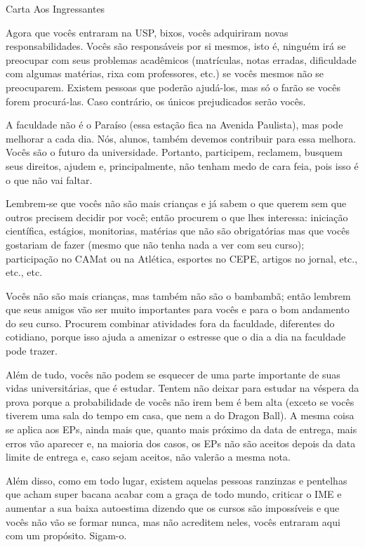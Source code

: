 \begin{secao}{Carta Aos Ingressantes}

Agora que vocês entraram na USP, bixos, vocês adquiriram novas
responsabilidades.  Vocês são responsáveis por si mesmos, isto é, ninguém irá se
preocupar com seus problemas acadêmicos (matrículas, notas erradas, dificuldade
com algumas matérias, rixa com professores, etc.) se vocês mesmos não se
preocuparem. Existem pessoas que poderão ajudá-los, mas só o farão se vocês
forem procurá-las. Caso contrário, os únicos prejudicados serão vocês.

A faculdade não é o Paraíso (essa estação fica na Avenida Paulista), mas pode
melhorar a cada dia. Nós, alunos, também devemos contribuir para essa melhora.
Vocês são o futuro da universidade. Portanto, participem, reclamem, busquem seus
direitos, ajudem e, principalmente, não tenham medo de cara feia, pois isso é o
que não vai faltar.

Lembrem-se que vocês não são mais crianças e já sabem o que querem sem que
outros precisem decidir por você; então procurem o que lhes interessa: iniciação
científica, estágios, monitorias, matérias que não são obrigatórias mas que
vocês gostariam de fazer (mesmo que não tenha nada a ver com seu curso);
participação no CAMat ou na Atlética, esportes no CEPE, artigos no jornal, etc.,
etc., etc.

Vocês não são mais crianças, mas também não são o bambambã; então lembrem que
seus amigos vão ser muito importantes para vocês e para o bom andamento do seu
curso. Procurem combinar atividades fora da faculdade, diferentes do cotidiano,
porque isso ajuda a amenizar o estresse que o dia a dia na faculdade pode
trazer.

Além de tudo, vocês não podem se esquecer de uma parte importante de suas vidas
universitárias, que é estudar. Tentem não deixar para estudar na véspera da
prova porque a probabilidade de vocês não irem bem é bem alta (exceto se vocês
tiverem uma sala do tempo em casa, que nem a do Dragon Ball). A mesma coisa se
aplica aos EPs, ainda mais que, quanto mais próximo da data de entrega, mais
erros vão aparecer e, na maioria dos casos, os EPs não são aceitos depois da
data limite de entrega e, caso sejam aceitos, não valerão a mesma nota.

Além disso, como em todo lugar, existem aquelas pessoas ranzinzas e pentelhas
que acham super bacana acabar com a graça de todo mundo, criticar o IME e
aumentar a sua baixa autoestima dizendo que os cursos são impossíveis e que
vocês não vão se formar nunca, mas não acreditem neles, vocês entraram aqui com
um propósito. Sigam-o.


\end{secao}
